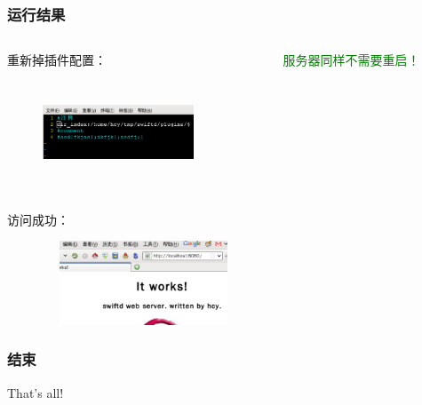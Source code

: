 \documentclass[10pt,dvipdfm]{beamer}
\begin{document}
\begin{frame}
	\frametitle{运行结果}
	\begin{columns}
		\begin{column}{0.6\textwidth}
			\begin{block}{重新掉插件配置：}
			\begin{figure}[htbp]
			\centering
			\includegraphics[height=3cm, width=4.5cm]{pics/uncomplugin.eps}
			\end{figure}
			\end{block}
		\end{column}
		
		\begin{column}{0.3\textwidth}
			\textcolor{green}{服务器同样不需要重启！}
		\end{column}
	\end{columns}
	
	\begin{block}{访问成功：}
	\begin{figure}[htbp]
	\centering
	\includegraphics[height=2.5cm, width=6cm]{pics/dirindex.eps}
	\end{figure}
	\end{block}
\end{frame}
\begin{frame}
	\frametitle{结束}
	\begin{center}
	{\Huge
		That's all!
	}
	\end{center}
\end{frame}
\end{document}
